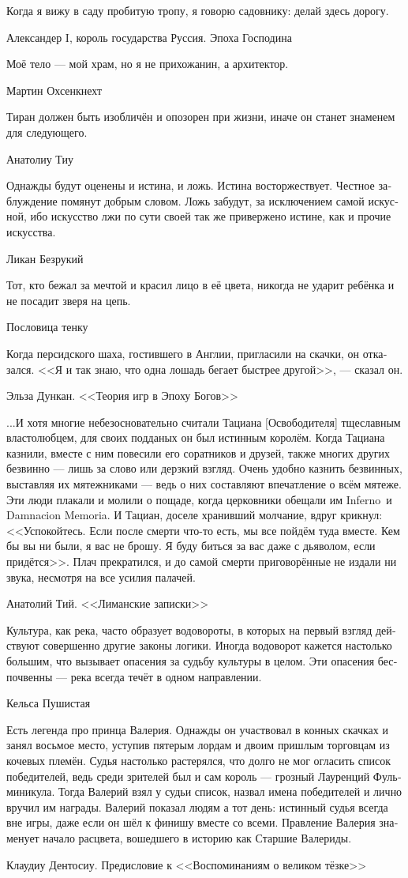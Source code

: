 \documentclass[a4paper,12pt,fleqn]{book}\usepackage{cooltooltips}\usepackage{polyglossia}\setdefaultlanguage[babelshorthands=true]{russian}\setotherlanguage{english}\defaultfontfeatures{Ligatures=TeX,Mapping=tex-text} \usepackage{xcolor}\definecolor{lightgray}{HTML}{bbbbbb}\color{lightgray}\newcommand{\ml}[3]{\textenglish{\textcolor{black}{#3}}}
\newcommand{\FM}{\footnotemark}
\newcommand{\FA}[1]{\footnotetext{#1 \emph{\ml{$0$}{---~Прим.~авт.}{---~Author.}}}}
\begin{document}
{\epigraph
{Когда я вижу в саду пробитую тропу, я говорю садовнику: делай здесь дорогу.}
{Александер I, король государства Руссия.
Эпоха Господина}

\epigraph
{Моё тело --- мой храм, но я не прихожанин, а архитектор.}
{Мартин Охсенкнехт}

\epigraph
{Тиран должен быть изобличён и опозорен при жизни, иначе он станет знаменем для следующего.}
{Анатолиу Тиу}

\epigraph
{Однажды будут оценены и истина, и ложь.
Истина восторжествует.
Честное заблуждение помянут добрым словом.
Ложь забудут, за исключением самой искусной, ибо искусство лжи по сути своей так же привержено истине, как и прочие искусства.}
{Ликан Безрукий}

\epigraph
{Тот, кто бежал за мечтой и красил лицо в её цвета, никогда не ударит ребёнка и не посадит зверя на цепь.}
{Пословица тенку}

\epigraph
{Когда персидского шаха, гостившего в Англии, пригласили на скачки, он отказался.
<<Я и так знаю, что одна лошадь бегает быстрее другой>>, --- сказал он.}
{Эльза Дункан.
<<Теория игр в Эпоху Богов>>}

\epigraph
{...И хотя многие небезосновательно считали Тациана [Освободителя] тщеславным властолюбцем, для своих подданых он был истинным королём.
Когда Тациана казнили, вместе с ним повесили его соратников и друзей, также многих других безвинно --- лишь за слово или дерзкий взгляд.
Очень удобно казнить безвинных, выставляя их мятежниками --- ведь о них составляют впечатление о всём мятеже.
Эти люди плакали и молили о пощаде, когда церковники обещали им Inferno\FM\ и Damnacion Memoria\FM.
И Тациан, доселе хранивший молчание, вдруг крикнул: <<Успокойтесь.
Если после смерти что-то есть, мы все пойдём туда вместе.
Кем бы вы ни были, я вас не брошу.
Я буду биться за вас даже с дьяволом, если придётся>>.
Плач прекратился, и до самой смерти приговорённые не издали ни звука, несмотря на все усилия палачей.}
{Анатолий Тий.
<<Лиманские записки>>}
\FA{
Подземный мир (t-sl.).
}
\FA{
Осквернение памяти (t-sl.).
}

\epigraph
{Культура, как река, часто образует водовороты, в которых на первый взгляд действуют совершенно другие законы логики.
Иногда водоворот кажется настолько большим, что вызывает опасения за судьбу культуры в целом.
Эти опасения беспочвенны --- река всегда течёт в одном направлении.}
{Кельса Пушистая}

\epigraph
{Есть легенда про принца Валерия.
Однажды он участвовал в конных скачках и занял восьмое место, уступив пятерым лордам и двоим пришлым торговцам из кочевых племён.
Судья настолько растерялся, что долго не мог огласить список победителей, ведь среди зрителей был и сам король --- грозный Лауренций Фульминикула.
Тогда Валерий взял у судьи список, назвал имена победителей и лично вручил им награды.
Валерий показал людям а тот день: истинный судья всегда вне игры, даже если он шёл к финишу вместе со всеми.
Правление Валерия знаменует начало расцвета, вошедшего в историю как Старшие Валериды.}
{Клаудиу Дентосиу.
Предисловие к <<Воспоминаниям о великом тёзке>>}

}
\end{document}
